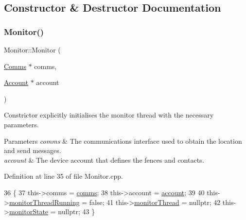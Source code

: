 \subsection{Constructor \& Destructor Documentation}
\mbox{\label{class_monitor_a092bf291d6c9d140c1edf59875ddf143}} 
\subsubsection{\texorpdfstring{Monitor()}{Monitor()}\hspace{0.1cm}{\footnotesize\ttfamily [1/2]}}
{\footnotesize\ttfamily Monitor\+::\+Monitor (\begin{DoxyParamCaption}\item[{\hyperlink{class_comms}{Comms} $\ast$}]{comms,  }\item[{\hyperlink{class_account}{Account} $\ast$}]{account }\end{DoxyParamCaption})}

Constrictor explicitly initialises the monitor thread with the necessary parameters.


\begin{DoxyParams}{Parameters}
{\em comms} & The communications interface used to obtain the location and send messages. \\
\hline
{\em account} & The device account that defines the fences and contacts. \\
\hline
\end{DoxyParams}


Definition at line 35 of file Monitor.\+cpp.


\begin{DoxyCode}
36 \{
37     this->comms = \hyperlink{class_monitor_a42fffadeba33ae6080b1d95783ca703b}{comms};
38     this->account = \hyperlink{class_monitor_acacff99178fbcd9eae50801acc346bf4}{account};
39 
40     this->\hyperlink{class_monitor_a63d26dffb146b9cfd0705163f3dc4745}{monitorThreadRunning} = \textcolor{keyword}{false};
41     this->\hyperlink{class_monitor_a1e6bfb7c47a223d8bdc537e2cff07822}{monitorThread} = \textcolor{keyword}{nullptr};
42     this->\hyperlink{class_monitor_a56b40e06ac7f2f36520e82ee01a17d4c}{monitorState} = \textcolor{keyword}{nullptr};
43 \}
\end{DoxyCode}
\mbox{\label{class_monitor_aa7e89b9dc22b89f4d12b82eda450c1a0}} 
